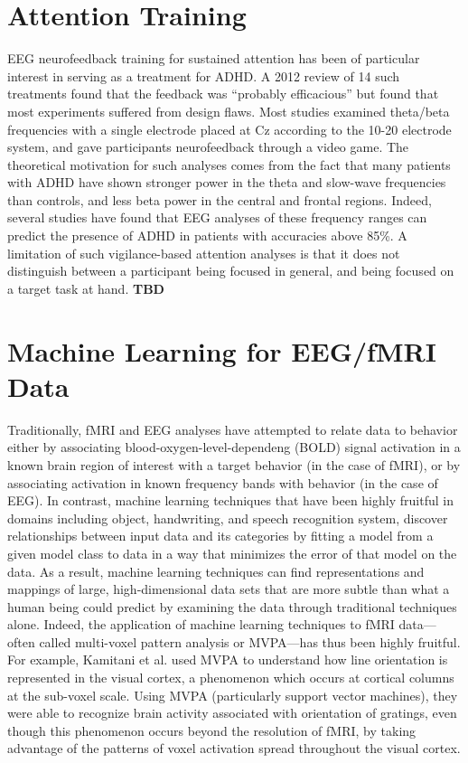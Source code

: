 \documentclass[12pt]{report}
\begin{document}
\section{Attention Training}
	EEG neurofeedback training for sustained attention has been of particular interest in serving as a treatment for ADHD.  A 2012 review\cite{Lofthouse} of 14 such treatments found that the feedback was ``probably efficacious'' but found that most experiments suffered from design flaws.  Most studies examined theta/beta frequencies with a single electrode placed at Cz according to the 10-20 electrode system, and gave participants neurofeedback through a video game.  The theoretical motivation for such analyses comes from the fact that many patients with ADHD have shown stronger power in the theta and slow-wave frequencies than controls, and less beta power in the central and frontal regions.  Indeed, several studies\cite{Barry} have found that EEG analyses of these frequency ranges can predict the presence of ADHD in patients with accuracies above 85\%.  A limitation of such vigilance-based attention analyses is that it does not distinguish between a participant being focused in general, and being focused on a target task at hand. {\bf TBD}
	
\section{Machine Learning for EEG/fMRI Data}
	Traditionally, fMRI and EEG analyses have attempted to relate data to behavior either by associating blood-oxygen-level-dependeng (BOLD) signal activation in a known brain region of interest with a target behavior (in the case of fMRI)\cite{Schnyer}, or by associating activation in known frequency bands with behavior (in the case of EEG).  In contrast, machine learning techniques that have been highly fruitful in domains including object, handwriting, and speech recognition system, discover relationships between input data and its categories by fitting a model from a given model class to data in a way that minimizes the error of that model on the data.  As a result, machine learning techniques can find representations and mappings of large, high-dimensional data sets that are more subtle than what a human being could predict by examining the data through traditional techniques alone.  Indeed, the application of machine learning techniques to fMRI data---often called multi-voxel pattern analysis or MVPA---has thus been highly fruitful\cite{Norman}.  For example, Kamitani et al. \cite{Kamitani} used MVPA to understand how line orientation is represented in the visual cortex, a phenomenon which occurs at cortical columns at the sub-voxel scale.   Using MVPA (particularly support vector machines), they were able to recognize brain activity associated with orientation of gratings, even though this phenomenon occurs beyond the resolution of fMRI, by taking advantage of the patterns of voxel activation spread throughout the visual cortex.  
		
\end{document}
